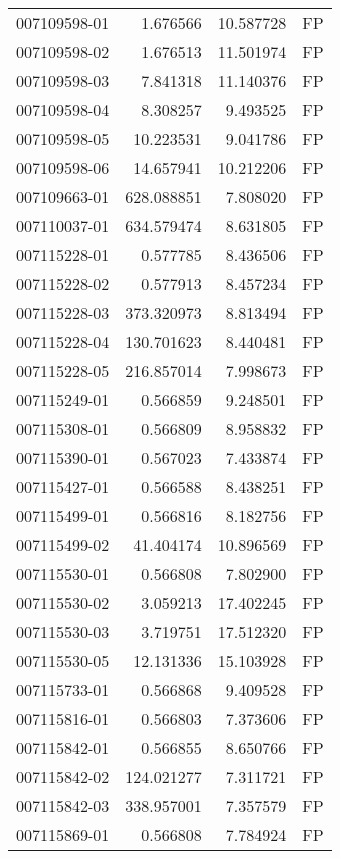 \begin{tabular}{lrrl}
007109598-01 &    1.676566 &    10.587728 &   FP \\
007109598-02 &    1.676513 &    11.501974 &   FP \\
007109598-03 &    7.841318 &    11.140376 &   FP \\
007109598-04 &    8.308257 &     9.493525 &   FP \\
007109598-05 &   10.223531 &     9.041786 &   FP \\
007109598-06 &   14.657941 &    10.212206 &   FP \\
007109663-01 &  628.088851 &     7.808020 &   FP \\
007110037-01 &  634.579474 &     8.631805 &   FP \\
007115228-01 &    0.577785 &     8.436506 &   FP \\
007115228-02 &    0.577913 &     8.457234 &   FP \\
007115228-03 &  373.320973 &     8.813494 &   FP \\
007115228-04 &  130.701623 &     8.440481 &   FP \\
007115228-05 &  216.857014 &     7.998673 &   FP \\
007115249-01 &    0.566859 &     9.248501 &   FP \\
007115308-01 &    0.566809 &     8.958832 &   FP \\
007115390-01 &    0.567023 &     7.433874 &   FP \\
007115427-01 &    0.566588 &     8.438251 &   FP \\
007115499-01 &    0.566816 &     8.182756 &   FP \\
007115499-02 &   41.404174 &    10.896569 &   FP \\
007115530-01 &    0.566808 &     7.802900 &   FP \\
007115530-02 &    3.059213 &    17.402245 &   FP \\
007115530-03 &    3.719751 &    17.512320 &   FP \\
007115530-05 &   12.131336 &    15.103928 &   FP \\
007115733-01 &    0.566868 &     9.409528 &   FP \\
007115816-01 &    0.566803 &     7.373606 &   FP \\
007115842-01 &    0.566855 &     8.650766 &   FP \\
007115842-02 &  124.021277 &     7.311721 &   FP \\
007115842-03 &  338.957001 &     7.357579 &   FP \\
007115869-01 &    0.566808 &     7.784924 &   FP \\

\end{tabular}
